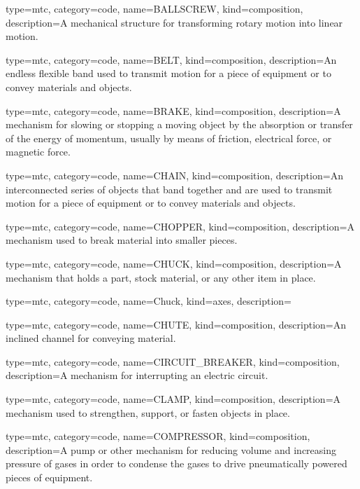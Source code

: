 {
  type=mtc,
  category=code,
  name={BALLSCREW},
  kind={composition},
  description={A mechanical structure for transforming rotary motion into linear motion.}
}


{
  type=mtc,
  category=code,
  name={BELT},
  kind={composition},
  description={An endless flexible band used to transmit motion for a piece of equipment or to convey materials and objects.}
}


{
  type=mtc,
  category=code,
  name={BRAKE},
  kind={composition},
  description={A mechanism for slowing or stopping a moving object by the absorption or transfer of the energy of momentum, usually by means of friction, electrical force, or magnetic force.}
}


{
  type=mtc,
  category=code,
  name={CHAIN},
  kind={composition},
  description={An interconnected series of objects that band together and are used to transmit motion for a piece of equipment or to convey materials and objects.}
}


{
  type=mtc,
  category=code,
  name={CHOPPER},
  kind={composition},
  description={A mechanism used to break material into smaller pieces.}
}


{
  type=mtc,
  category=code,
  name={CHUCK},
  kind={composition},
  description={A mechanism that holds a part, stock material, or any other item in place.}
}


{
  type=mtc,
  category=code,
  name={Chuck},
  kind={axes},
  description={}
}


{
  type=mtc,
  category=code,
  name={CHUTE},
  kind={composition},
  description={An inclined channel for conveying material.}
}


{
  type=mtc,
  category=code,
  name={CIRCUIT\_BREAKER},
  kind={composition},
  description={A mechanism for interrupting an electric circuit.}
}


{
  type=mtc,
  category=code,
  name={CLAMP},
  kind={composition},
  description={A mechanism used to strengthen, support, or fasten objects in place.}
}


{
  type=mtc,
  category=code,
  name={COMPRESSOR},
  kind={composition},
  description={A pump or other mechanism for reducing volume and increasing pressure of gases in order to condense the gases to drive pneumatically powered pieces of equipment.}
}


